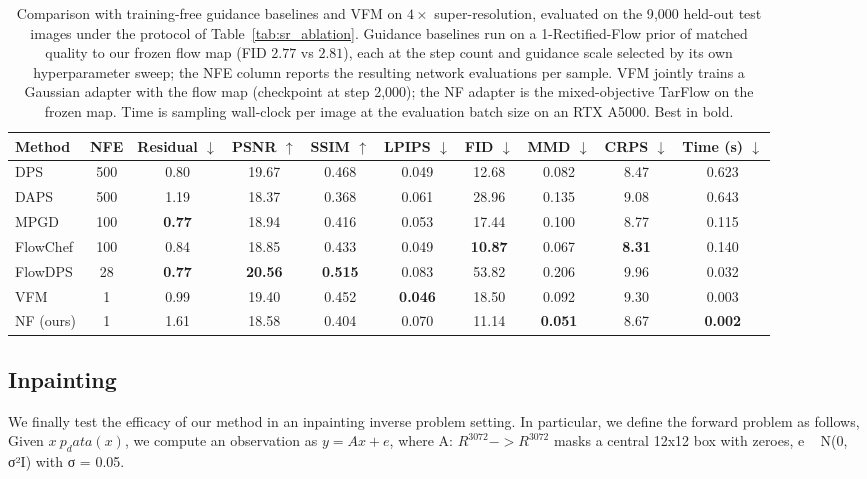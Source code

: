 \documentclass[12pt,a4paper]{report}
\begin{document}
\begin{table}[t]
\centering
\footnotesize
\setlength{\tabcolsep}{3pt}
\begin{tabular}{l c ccccccc c}
\toprule
Method & NFE & Residual $\downarrow$ & PSNR $\uparrow$ & SSIM $\uparrow$ & LPIPS $\downarrow$ & FID $\downarrow$ & MMD $\downarrow$ & CRPS $\downarrow$ & Time (s) $\downarrow$ \\
\midrule
DPS       & 500 & 0.80 & 19.67 & 0.468 & 0.049 & 12.68 & 0.082 & 8.47 & 0.623 \\
DAPS      & 500 & 1.19 & 18.37 & 0.368 & 0.061 & 28.96 & 0.135 & 9.08 & 0.643 \\
MPGD      & 100 & \textbf{0.77} & 18.94 & 0.416 & 0.053 & 17.44 & 0.100 & 8.77 & 0.115 \\
FlowChef  & 100 & 0.84 & 18.85 & 0.433 & 0.049 & \textbf{10.87} & 0.067 & \textbf{8.31} & 0.140 \\
FlowDPS   & 28  & \textbf{0.77} & \textbf{20.56} & \textbf{0.515} & 0.083 & 53.82 & 0.206 & 9.96 & 0.032 \\
\midrule
VFM       & 1 & 0.99 & 19.40 & 0.452 & \textbf{0.046} & 18.50 & 0.092 & 9.30 & 0.003 \\
NF (ours) & 1 & 1.61 & 18.58 & 0.404 & 0.070 & 11.14 & \textbf{0.051} & 8.67 & \textbf{0.002} \\
\bottomrule
\end{tabular}
\caption{Comparison with training-free guidance baselines and VFM on $4\times$
super-resolution, evaluated on the 9{,}000 held-out test images under the
protocol of Table~\ref{tab:sr_ablation}. Guidance baselines run on a
1-Rectified-Flow prior of matched quality to our frozen flow map (FID $2.77$ vs
$2.81$), each at the step count and guidance scale selected by its own
hyperparameter sweep; the NFE column reports the resulting network evaluations
per sample. VFM jointly trains a Gaussian adapter with the flow map (checkpoint
at step 2{,}000); the NF adapter is the mixed-objective TarFlow on the frozen
map. Time is sampling wall-clock per image at the evaluation batch size on an
RTX A5000. Best in bold.}
\label{tab:sr_baselines}
\end{table}

\subsection{Inpainting}
We finally test the efficacy of our method in an inpainting inverse problem setting. 
In particular, we define the forward problem as follows, 
Given $x ~ p_data(x)$, we compute an observation as $y = Ax + e$, where A: $R^3072 -> R^3072$ masks a central 12x12 box with zeroes, e ~ N(0, σ²I) with σ = 0.05. 
\end{document}
